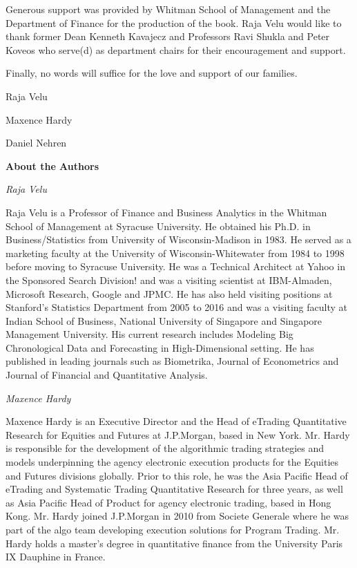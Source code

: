 Generous support was provided by Whitman School of Management and the Department of Finance for the production of the book. Raja Velu would like to thank former Dean Kenneth Kavajecz and Professors Ravi Shukla and Peter Koveos who serve(d) as department chairs for their encouragement and support.


Finally, no words will suffice for the love and support of our families. \vspace{3\baselineskip}


\noindent Raja Velu \par
\noindent Maxence Hardy \par
\noindent Daniel Nehren



\newpage



{\noindent\Large\bfseries About the Authors} \vspace{1cm}


{\noindent\large\itshape Raja Velu} \medskip

\noindent Raja Velu is a Professor of Finance and Business Analytics in the Whitman School of Management at Syracuse University. He obtained his Ph.D. in Business/Statistics from University of Wisconsin-Madison in 1983. He served as a marketing faculty at the University of Wisconsin-Whitewater from 1984 to 1998 before moving to Syracuse University. He was a Technical Architect at Yahoo in the Sponsored Search Division! and was a visiting scientist at IBM-Almaden, Microsoft Research, Google and JPMC. He has also held visiting positions at Stanford's Statistics Department from 2005 to 2016 and was a visiting faculty at Indian School of Business, National University of Singapore and Singapore Management University. His current research includes Modeling Big Chronological Data and Forecasting in High-Dimensional setting. He has published in leading journals such as Biometrika, Journal of Econometrics and Journal of Financial and Quantitative Analysis. \bigskip


{\noindent\large\itshape Maxence Hardy} \medskip

\noindent Maxence Hardy is an Executive Director and the Head of eTrading Quantitative Research for Equities and Futures at J.P.Morgan, based in New York. Mr. Hardy is responsible for the development of the algorithmic trading strategies and models underpinning the agency electronic execution products for the Equities and Futures divisions globally. Prior to this role, he was the Asia Pacific Head of eTrading and Systematic Trading Quantitative Research for three years, as well as Asia Pacific Head of Product for agency electronic trading, based in Hong Kong. Mr. Hardy joined J.P.Morgan in 2010 from Societe Generale where he was part of the algo team developing execution solutions for Program Trading. Mr. Hardy holds a master's degree in quantitative finance from the University Paris IX Dauphine in France. \bigskip


